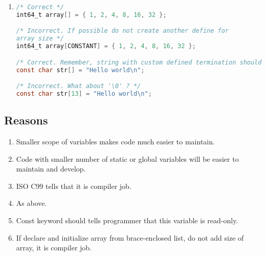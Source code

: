 \begin{enumerate}
\begin{lstlisting}[language=C,style=C99]
if (list_length > CONSTANT)
{
    do_this();
}

/* Incorrect. If length of list is read only, variable must be const. It is only information for programmer (Of course compiler will throw out const keyword) */
size_t list_length = list_get_length(list_p);

if (list_length > CONSTANT)
{
    do_this();
}
\end{lstlisting}    

    \item 
\begin{lstlisting}[language=C,style=C99]
/* Correct */
int64_t array[] = { 1, 2, 4, 8, 16, 32 };

/* Incorrect. If possible do not create another define for 
array size */
int64_t array[CONSTANT] = { 1, 2, 4, 8, 16, 32 };

/* Correct. Remember, string with custom defined termination should be defined without size */
const char str[] = "Hello world\n";

/* Incorrect. What about '\0' ? */
const char str[13] = "Hello world\n";
\end{lstlisting}   
\end{enumerate}

\subsection{Reasons}
\begin{enumerate}
    \item Smaller scope of variables makes code much easier to maintain.
    \item Code with smaller number of static or global variables will be easier to maintain and develop.
    \item ISO C99 tells that it is compiler job.
    \item As above.
    \item Const keyword should tells programmer that this variable is read-only.
    \item If declare and initialize array from brace-enclosed list, do not add size of array, it is compiler job.
\end{enumerate}